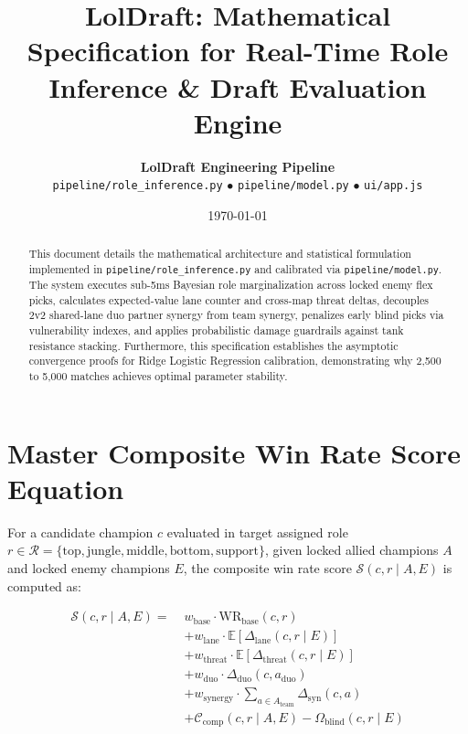 \documentclass[11pt,a4paper]{article}
\title{\textbf{LolDraft: Mathematical Specification for Real-Time Role Inference \& Draft Evaluation Engine}}
\author{\textbf{LolDraft Engineering Pipeline} \\ \texttt{pipeline/role\_inference.py} $\bullet$ \texttt{pipeline/model.py} $\bullet$ \texttt{ui/app.js}}
\date{\today}
\begin{document}
\maketitle

\begin{abstract}
This document details the mathematical architecture and statistical formulation implemented in \texttt{pipeline/role\_inference.py} and calibrated via \texttt{pipeline/model.py}. The system executes sub-5ms Bayesian role marginalization across locked enemy flex picks, calculates expected-value lane counter and cross-map threat deltas, decouples 2v2 shared-lane duo partner synergy from team synergy, penalizes early blind picks via vulnerability indexes, and applies probabilistic damage guardrails against tank resistance stacking. Furthermore, this specification establishes the asymptotic convergence proofs for Ridge Logistic Regression calibration, demonstrating why 2,500 to 5,000 matches achieves optimal parameter stability.
\end{abstract}

\section{Master Composite Win Rate Score Equation}

For a candidate champion $c$ evaluated in target assigned role $r \in \mathcal{R} = \{\text{top}, \text{jungle}, \text{middle}, \text{bottom}, \text{support}\}$, given locked allied champions $A$ and locked enemy champions $E$, the composite win rate score $\mathcal{S}(c, r \mid A, E)$ is computed as:

\begin{equation}
\label{eq:master_score}
\begin{aligned}
\mathcal{S}(c, r \mid A, E) =\; & w_{\text{base}} \cdot \text{WR}_{\text{base}}(c, r) \\
& + w_{\text{lane}} \cdot \mathbb{E}[\Delta_{\text{lane}}(c, r \mid E)] \\
& + w_{\text{threat}} \cdot \mathbb{E}[\Delta_{\text{threat}}(c, r \mid E)] \\
& + w_{\text{duo}} \cdot \Delta_{\text{duo}}(c, a_{\text{duo}}) \\
& + w_{\text{synergy}} \cdot \sum_{a \in A_{\text{team}}} \Delta_{\text{syn}}(c, a) \\
& + \mathcal{C}_{\text{comp}}(c, r \mid A, E) - \Omega_{\text{blind}}(c, r \mid E)
\end{aligned}
\end{equation}
\end{document}
